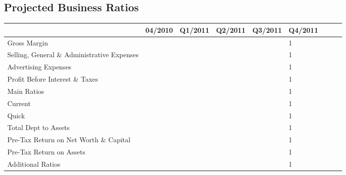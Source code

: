 \documentclass[11pt]{article}
\begin{document}
\newpage
\thispagestyle{empty}
\begin{landscape}
\subsection{Projected Business Ratios}
\begin{scriptsize}
\begin{tabular}{ | l | l | l | l | l | l | l | l | l |}\hline
  & 04/2010 & Q1/2011 & Q2/2011 & Q3/2011 & Q4/2011 \\ \hline
  Gross Margin & & & & & 1\\ \hline
  Selling, General \& Administrative Expenses & & & & & 1 \\ \hline
  Advertising Expenses & & & & & 1\\ \hline
  Profit Before Interest \& Taxes & & & & & 1 \\ \hline
  Main Ratios & & & & & 1\\ \hline
  Current & & & & & 1 \\ \hline
  Quick & & & & & 1\\ \hline
  Total Dept to Assets & & & & & 1 \\ \hline
  Pre-Tax Return on Net Worth \& Capital & & & & & 1\\ \hline
  Pre-Tax Return on Assets & & & & & 1 \\ \hline
  Additional Ratios & & & & & 1 \\ \hline

\end{tabular}
\end{scriptsize}
\end{landscape}
\end{document}
